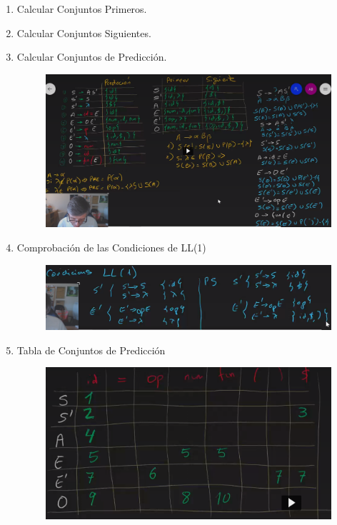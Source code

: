 \documentclass[12pt, twoside, openright]{report} %
\begin{document}
\begin{enumerate}
\def\labelenumi{\arabic{enumi}.}

\item
  Calcular Conjuntos Primeros.
\item
  Calcular Conjuntos Siguientes.
\item
  Calcular Conjuntos de Predicción.

\begin{figure}[H]
	{\includegraphics[scale=.12]{image-20210320110844879.png}}
\end{figure}

\item
  Comprobación de las Condiciones de
  LL(1)
  
  \begin{figure}[H]
	{\includegraphics[scale=.17]{image-20210320110940170.png}}
\end{figure}

\pagebreak
\item
  Tabla de Conjuntos de Predicción


  \begin{figure}[H]
	{\includegraphics[scale=.2]{image-20210320111419566.png}}
\end{figure}


\end{enumerate}
\end{document}
